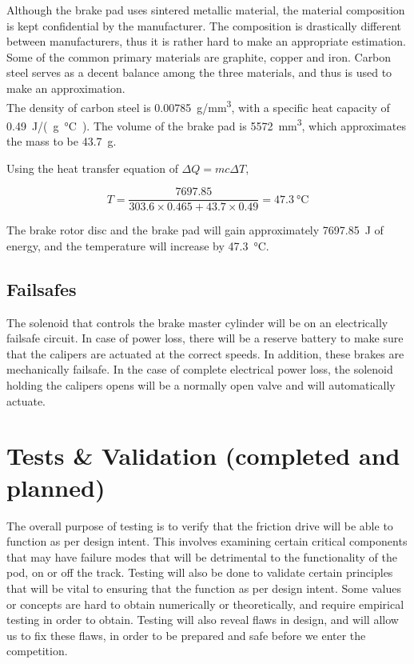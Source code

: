 \documentclass[main.tex]{subfiles}
\begin{document}
    Although the brake pad uses sintered metallic material, the material composition is kept confidential by the manufacturer. The composition is drastically different between manufacturers, thus it is rather hard to make an appropriate estimation. Some of the common primary materials are graphite, copper and iron. Carbon steel serves as a decent balance among the three materials, and thus is used to make an approximation.\\

    The density of carbon steel is \SI{0.00785}{g/mm^3}, with a specific heat capacity of \SI{0.49}{J/(g\celsius)}. The volume of the brake pad is \SI{5572}{mm^3}, which approximates the mass to be \SI{43.7}{g}.

    Using the heat transfer equation of $\Delta Q = mc \Delta T$,

    \begin{equation}
    	T=\frac{7697.85}{303.6 \times 0.465+43.7 \times 0.49}=\SI{47.3}{\celsius}
    \end{equation}

    The brake rotor disc and the brake pad will gain approximately \SI{7697.85}{J} of energy, and the temperature will increase by \SI{47.3}{\celsius}.\\

    \subsection{Failsafes}
    The solenoid that controls the brake master cylinder will be on an electrically failsafe circuit. In case of power loss, there will be a reserve battery to make sure that the calipers are actuated at the correct speeds. In addition, these brakes are mechanically failsafe. In the case of complete electrical power loss, the solenoid holding the calipers opens will be a normally open valve and will automatically actuate.
    

    \section{Tests \& Validation (completed and planned)}
	The overall purpose of testing is to verify that the friction drive will be able to function as per design intent. This involves examining certain critical components that may have failure modes that will be detrimental to the functionality of the pod, on or off the track. Testing will also be done to validate certain principles that will be vital to ensuring that the function as per design intent. Some values or concepts are hard to obtain numerically or theoretically, and require empirical testing in order to obtain. Testing will also reveal flaws in design, and will allow us to fix these flaws, in order to be prepared and safe before we enter the competition.\\
    
\end{document}
